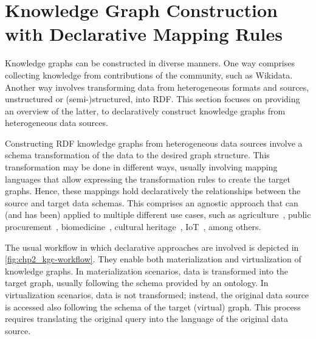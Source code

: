 \section{Knowledge Graph Construction with Declarative Mapping Rules}
\label{sec:chp2_declarative_kgc}

Knowledge graphs can be constructed in diverse manners. One way comprises collecting knowledge from contributions of the community, such as Wikidata. Another way involves transforming data from heterogeneous formats and sources, unstructured or (semi-)structured, into RDF. This section focuses on providing an overview of the latter, to declaratively construct knowledge graphs from heterogeneous data sources.




Constructing RDF knowledge graphs from heterogeneous data sources involve a schema transformation of the data to the desired graph structure. This transformation may be done in different ways, usually involving mapping languages that allow expressing the transformation rules to create the target graphs. Hence, these mappings hold declaratively the relationships between the source and target data schemas. This comprises an agnostic approach that can (and has been) applied to multiple different use cases, such as agriculture~\parencite{bilbao2022practical}, public procurement~\parencite{soylu2022theybuyforyou}, biomedicine~\parencite{iglesias2019bio2rdf,michel2020covid,aisopos2023knowledge}, cultural heritage~\parencite{calvanese2016culturalheritage}, IoT~\parencite{cimmino2020ewot,gonzalezgerpe2022extension}, among others.

The usual workflow in which declarative approaches are involved is depicted in \cref{fig:chp2_kgc-workflow}. They enable both materialization and virtualization of knowledge graphs. In materialization scenarios, data is transformed into the target graph, usually following the schema provided by an ontology. In virtualization scenarios, data is not transformed; instead, the original data source is accessed also following the schema of the target (virtual) graph. This process requires translating the original query into the language of the original data source. %

